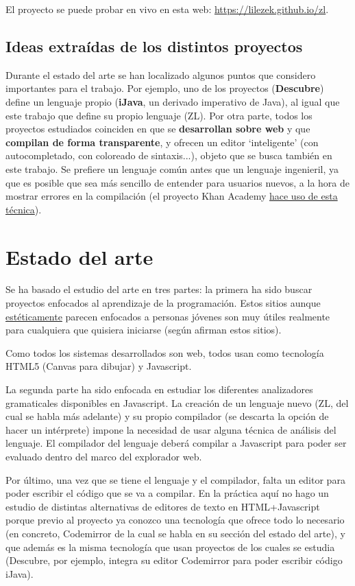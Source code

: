 \documentclass{report}
\begin{document}
	El proyecto se puede probar en vivo en esta web: \href{https://lilezek.github.io/zl}{https://lilezek.github.io/zl}.
	
	\section{Ideas extraídas de los distintos proyectos}
	
	Durante el estado del arte se han localizado algunos puntos que considero importantes para el trabajo. Por ejemplo, uno de los proyectos (\textbf{Descubre}) define un lenguaje propio (\textbf{iJava}, un derivado imperativo de Java), al igual que este trabajo que define su propio lenguaje (ZL). Por otra parte, todos los proyectos estudiados coinciden en que se \textbf{desarrollan sobre web} y que \textbf{compilan de forma transparente}, y ofrecen un editor `inteligente' (con autocompletado, con coloreado de sintaxis...), objeto que se busca también en este trabajo. Se prefiere un lenguaje común antes que un lenguaje ingenieril, ya que es posible que sea más sencillo de entender para usuarios nuevos, a la hora de mostrar errores en la compilación (el proyecto Khan Academy \hyperref[app:d]{hace uso de esta técnica}).
	
	\chapter{Estado del arte}

	Se ha basado el estudio del arte en tres partes: la primera ha sido buscar proyectos enfocados al aprendizaje de la programación. Estos sitios aunque \hyperref[app:b]{estéticamente} parecen enfocados a personas jóvenes son muy útiles realmente para cualquiera que quisiera iniciarse (según afirman estos sitios).  
	
	Como todos los sistemas desarrollados son web, todos usan como tecnología HTML5 (Canvas para dibujar) y Javascript.

	La segunda parte ha sido enfocada en estudiar los diferentes analizadores gramaticales disponibles en Javascript. La creación de un lenguaje nuevo (ZL, del cual se habla más adelante) y su propio compilador (se descarta la opción de hacer un intérprete) impone la necesidad de usar alguna técnica de análisis del lenguaje. El compilador del lenguaje deberá compilar a Javascript para poder ser evaluado dentro del marco del explorador web.
	
	Por último, una vez que se tiene el lenguaje y el compilador, falta un editor para poder escribir el código que se va a compilar. En la práctica aquí no hago un estudio de distintas alternativas de editores de texto en HTML+Javascript porque previo al proyecto ya conozco una tecnología que ofrece todo lo necesario (en concreto, Codemirror de la cual se habla en su sección del estado del arte), y que además es la misma tecnología que usan proyectos de los cuales se estudia (Descubre, por ejemplo, integra su editor Codemirror para poder escribir código iJava).
	
\end{document}
